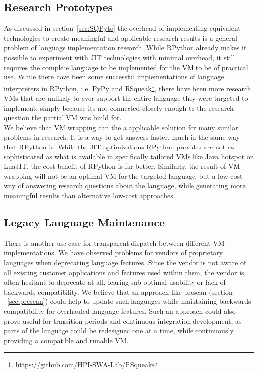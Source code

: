 \documentclass[preprint, nonatbib]{sigplanconf}
\begin{document}
\subsection{Research Prototypes}
As discussed in section~\ref{sec:SQPyte} the overhead of implementing equivalent technologies to create meaningful and applicable research results is a general problem of language implementation research. While RPython already makes it possible to experiment with JIT technologies with minimal overhead, it still requires the complete language to be implemented for the VM to be of practical use. While there have been some successful implementations of language interpreters in RPython, i.e. PyPy and RSqueak\footnote{https://github.com/HPI-SWA-Lab/RSqueak}, there have been more research VMs that are unlikely to ever support the entire language they were targeted to implement, simply because its not connected closely enough to the research question the partial VM was build for.\\
We believe that VM wrapping can the a applicable solution for many similar problems in research. It is a way to get answers faster, much in the same way that RPython is. While the JIT optimizations RPython provides are not as sophisticated as what is available in specifically tailored VMs like Java hotspot or LuaJIT, the cost-benefit of RPython is far better. Similarly, the result of VM wrapping will not be an optimal VM for the targeted language, but a low-cost way of answering research questions about the language, while generating more meaningful results than alternative low-cost approaches.

\subsection{Legacy Language Maintenance}
There is another use-case for transparent dispatch between different VM implementations. 
We have observed problems for vendors of proprietary languages when deprecating language features. Since the vendor is not aware of all existing customer applications and features used within them, the vendor is often hesitant to deprecate at all, fearing sub-optimal usability or lack of backwards compatibility. We believe that an approach like prescan (section ~\ref{sec:prescan}) could help to update such languages while maintaining backwards compatibility for overhauled language features. Such an approach could also prove useful for transition periods and continuous integration development, as parts of the language could be redesigned one at a time, while continuously providing a compatible and runable VM. 
\end{document}
